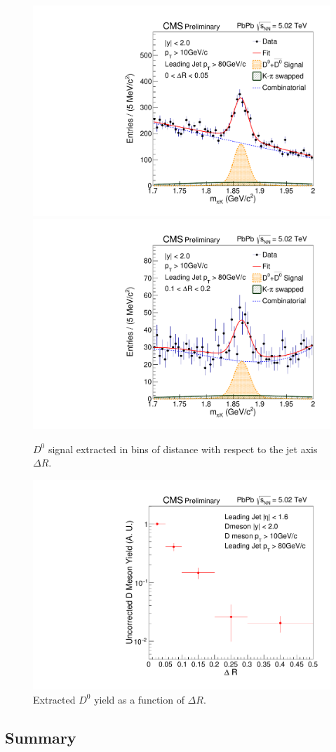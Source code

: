 \begin{figure}[!ht]
\begin{center}
\includegraphics[width=.49\textwidth]{DJetPlots/fhHistoMass_R0.pdf}
\includegraphics[width=.49\textwidth]{DJetPlots/fhHistoMass_R2.pdf}
\caption{$D^0$ signal extracted in bins of distance with respect to the jet axis $\Delta R$. }
\label{fig:D0_Jet}
\end{center}
\end{figure}

\begin{figure}[!ht]
\begin{center}
\includegraphics[width=.49\textwidth]{DJetPlots/PrelimYield.pdf}
\caption{Extracted $D^0$ yield as a function of $\Delta R$.}
\label{fig:D0_JetYield}
\end{center}
\end{figure}


\subsection{Summary}


